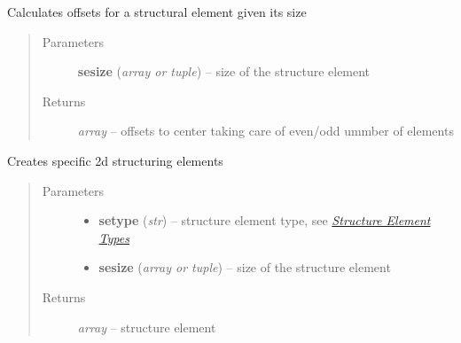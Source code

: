 \documentclass[letterpaper,10pt,english]{sphinxmanual}
\begin{document}

\begin{fulllineitems}
\label{api/ClearMap.ImageProcessing.Filter:ClearMap.ImageProcessing.Filter.StructureElement.structureElementOffsets}
Calculates offsets for a structural element given its size
\begin{quote}\begin{description}
\item[{Parameters}] \leavevmode
\textbf{sesize} (\emph{array or tuple}) --
size of the structure element

\item[{Returns}] \leavevmode
\emph{array} --
offsets to center taking care of even/odd ummber of elements

\end{description}\end{quote}

\end{fulllineitems}


\begin{fulllineitems}
\label{api/ClearMap.ImageProcessing.Filter:ClearMap.ImageProcessing.Filter.StructureElement.structureElement2D}
Creates specific 2d structuring elements
\begin{quote}\begin{description}
\item[{Parameters}] \leavevmode\begin{itemize}
\item {} 
\textbf{setype} (\emph{str}) --
structure element type, see {\hyperref[api/ClearMap.ImageProcessing.Filter:structureelementtypes]{\emph{Structure Element Types}}}

\item {} 
\textbf{sesize} (\emph{array or tuple}) --
size of the structure element

\end{itemize}

\item[{Returns}] \leavevmode
\emph{array} --
structure element

\end{description}\end{quote}

\end{fulllineitems}
\end{document}
